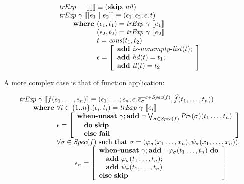 \[
\begin{array}{l}
\trExp{\_}{[]} \equiv (
  \skipE, \mathit{nil}
)\\
\trExp{\gamma}{[e_1~|~e_2]} \equiv (\epsilon_1;\epsilon_2;\epsilon, t)\\
  \qquad \textbf{where } (\epsilon_1, t_1) = \trExp{\gamma}{e_1}\\ 
  \qquad \phantom{\textbf{where }} (\epsilon_2, t_2) = \trExp{\gamma}{e_2}\\ 
  \qquad \phantom{\textbf{where }} t = \mathit{cons}(t_1, t_2)\\ 
  \qquad \phantom{\textbf{where }} \epsilon = \left[
    \begin{array}{l}
      \addE~\isnelist{t};\\
      \addE~\mathit{hd}(t) = t_1;\\
      \addE~\mathit{tl}(t) = t_2\\
    \end{array}
  \right]
\end{array}
\]

A more complex case is that of function application:

\[
\begin{array}{l}
\trExp{\gamma}{f(e_1, \ldots, e_n)} \equiv (\epsilon_1; \dots; \epsilon_n; \epsilon; \overline{\epsilon_\sigma}^{\sigma \in \Spec{f}}, \widehat{f}(t_1, \ldots, t_n))\\
\qquad \textbf{where } \forall i \in \{1..n\}. (\epsilon_i, t_i) = \trExp{\gamma}{e_i}\\
\qquad \phantom{\textbf{where }} \epsilon = \left[ 
  \begin{array}{l}
  \whenUnsatW~\gamma;\addE~\neg \bigvee_{\sigma \in \Spec{f}}\Pre{\sigma}(t_1\ldots,t_n)\\
  \quad\doW~\skipE\\
  \quad\elseW~\failE\\
  \end{array}
  \right]\\
\qquad \phantom{\textbf{where }} \forall \sigma \in \Spec{f} \textrm{ such that } \sigma = (\varphi_\sigma(x_1\ldots,x_n), \psi_\sigma(x_1, \ldots, x_n)).\\
\qquad\qquad\qquad\qquad \epsilon_\sigma = \left[ 
\begin{array}{l}
\whenUnsatW~\gamma;\addE~\neg \varphi_\sigma(t_1\ldots,t_n)~\doW\\
\quad\addE~\varphi_\sigma(t_1\ldots,t_n);\\
\quad\addE~\psi_\sigma(t_1,\ldots,t_n)\\
\elseW~\skipE\\
\end{array}
\right] \\
\end{array}
\]


